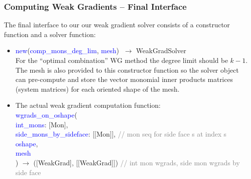 \documentclass[compress]{beamer}
\begin{document}
\begin{frame}
  \frametitle{Computing Weak Gradients -- Final Interface}
  The final interface to our our weak gradient solver consists of a constructor function and a solver function:\\ 
  \pause
  \begin{itemize}[<+->]
    \item  \textcolor{blue}{new}(\textcolor{blue}{comp\_mons\_deg\_lim}, \textcolor{blue}{mesh}) $\; \rightarrow$ {\small WeakGradSolver}\\
      For the ``optimal combination'' WG method the degree limit should be $k-1$.
      The mesh is also provided to this constructor function so the solver object can pre-compute and store the vector monomial
      inner products matrices (system matrices) for each oriented shape of the mesh.
    \item The actual weak gradient computation function:\\
      \textcolor{blue}{wgrads\_on\_oshape}(\\
      \hspace{.5cm} \textcolor{blue}{int\_mons}: [Mon],\\
      \hspace{.5cm} \textcolor{blue}{side\_mons\_by\_sideface}: [[Mon]], \textcolor{gray}{\scriptsize // mon seq for side face s at index s}\\
      \hspace{.5cm} \textcolor{blue}{oshape},\\
      \hspace{.5cm} \textcolor{blue}{mesh}\\
      ) $\rightarrow$ {\scriptsize ([WeakGrad], [[WeakGrad]])} \textcolor{gray}{\scriptsize // int mon wgrads, side mon wgrads by side face}
  \end{itemize}
\end{frame}
\end{document}
